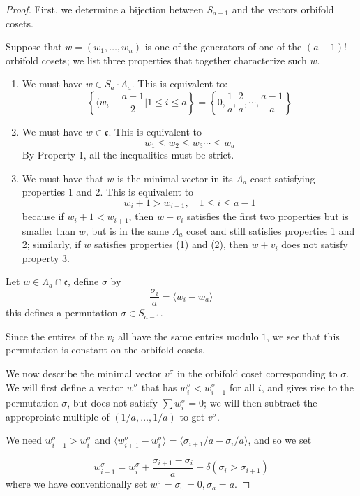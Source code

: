 \documentclass{amsart}[12pt]
\theoremstyle{definition}
\newcommand{\cone}{\mathfrak{c}}
\begin{document}
\begin{proof}
First, we determine a bijection between $S_{a-1}$ and the vectors orbifold cosets.  

Suppose that $w=(w_1,\dots, w_n)$ is one of the generators of one of the $(a-1)!$ orbifold cosets; we list three properties that together characterize such $w$.

\begin{enumerate}

\item We must have $w\in S_a\cdot \Lambda_a$. This is equivalent to:
$$\left\{ \langle w_i-\frac{a-1}{2}\Big| 1\leq i\leq a\right\}=\left\{0,\frac{1}{a},\frac{2}{a},\cdots,\frac{a-1}{a}\right\}$$

\item We must have $w\in\cone$.  This is equivalent to 
$$w_1\leq w_2 \leq w_3\cdots\leq w_a$$
By Property 1, all the inequalities must be strict.

\item We must have that $w$ is the minimal vector in its $\Lambda_a$  coset satisfying properties 1 and 2.  This is equivalent to
$$w_i+1>w_{i+1},\quad 1\leq i\leq a-1$$
because if $w_i+1<w_{i+1}$, then $w-v_i$ satisfies the first two properties but is smaller than $w$, but is in the same $\Lambda_a$ coset and still satisfies properties 1 and 2; similarly, if $w$ satisfies properties (1) and (2), then $w+v_i$ does not satisfy property 3.
\end{enumerate}

Let $w\in\Lambda_a\cap \cone$, define $\sigma$ by 
$$\frac{\sigma_i}{a}=\langle w_{i}-w_a\rangle$$
this defines a permutation $\sigma\in S_{a-1}$.

Since the entires of the $v_i$ all have the same entries modulo $1$, we see that this permutation is constant on the orbifold cosets.  

We now describe the minimal vector $v^\sigma$ in the orbifold coset corresponding to $\sigma$.  We will first define a vector $w^\sigma$ that has $w^\sigma_i<w^\sigma_{i+1}$ for all $i$, and gives rise to the permutation $\sigma$, but does not satisfy $\sum w_i^\sigma=0$; we will then subtract the approproiate multiple of $(1/a,\dots, 1/a)$ to get $v^\sigma$.

We need $w^\sigma_{i+1}>w^\sigma_i$ and $\langle w^\sigma_{i+1}-w^\sigma_i\rangle=\langle\sigma_{i+1}/a-\sigma_i/a\rangle$, and so we set

$$w^\sigma_{i+1}=w^\sigma_i+\frac{\sigma_{i+1}-\sigma_i}{a}+\delta(\sigma_i>\sigma_{i+1})$$
where we have conventionally set $w^\sigma_0=\sigma_0=0, \sigma_a=a$.


\end{proof}
\end{document}
